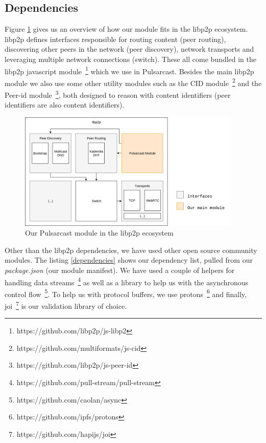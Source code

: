 \subsection{Dependencies}\label{subsec:dependencies}

Figure \ref{fig:pulsarcast-in-libp2p} gives us an overview of how our module
fits in the libp2p ecosystem. libp2p defines interfaces responsible for routing
content (peer routing), discovering other peers in the network (peer
discovery), network transports and leveraging multiple network connections
(switch). These all come bundled in the libp2p javascript
module~\footnote{https://github.com/libp2p/js-libp2} which we use in
Pulsarcast. Besides the main libp2p module we also use some other utility
modules such as the CID
module~\footnote{https://github.com/multiformats/js-cid} and the Peer-id
module~\footnote{https://github.com/libp2p/js-peer-id}, both designed to reason
with content identifiers (peer identifiers are also content identifiers). 

\begin{figure}[hb!]
  \centering
  \includegraphics[width=0.95\textwidth]{img/pulsarcast-in-libp2p.png}
  \caption{Our Pulsarcast module in the libp2p ecosystem}
  \label{fig:pulsarcast-in-libp2p}
\end{figure}

Other than the libp2p dependencies, we have used other open source community
modules. The listing \ref{dependencies} shows our dependency list, pulled from
our \emph{package.json} (our module manifest). We have used a couple of helpers
for handling data streams~\footnote{https://github.com/pull-stream/pull-stream}
as well as a library to help us with the asynchronous control
flow~\footnote{https://github.com/caolan/async}. To help us with protocol
buffers, we use protons~\footnote{https://github.com/ipfs/protons} and finally,
joi~\footnote{https://github.com/hapijs/joi} is our validation library of
choice.

